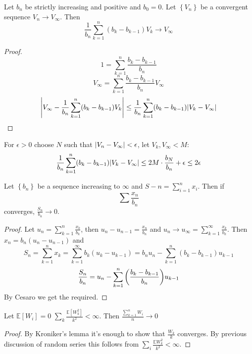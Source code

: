 \begin{lemma}
	Let $b_n$ be strictly increasing and positive and $b_0 = 0$. Let $\left\{ V_n\right\}$ be a convergent sequence $V_n\to V_\infty$. Then
	$$\frac{1}{b_n} \sum_{k=1}^n (b_k - b_{k-1})V_k \to V_\infty$$
	\begin{proof}
		$$1 = \sum_{k=1}^n \frac{b_k-b_{k-1}}{b_n} $$
		$$V_\infty = \sum_{k=1}^n \frac{b_k-b_{k-1}}{b_n} V_\infty $$
		$$\abs{V_\infty - \frac{1}{b_n} \sum_{k=1}^n (b_k-b_{k-1}) V_k} \leq \frac{1}{b_n} \sum_{k=1}^n (b_k-b_{k-1}) \abs{V_k-V_\infty}$$
	\end{proof}
For $\epsilon>0$ choose $N$ such that $\abs{V_n-V_\infty} < \epsilon$, let $V_k, V_\infty < M$:
$$\frac{1}{b_n} \sum_{k=1}^n (b_k-b_{k-1}) \abs{V_k-V_\infty} \leq 2M\cdot \frac{b_N}{b_n} + \epsilon \leq 2 \epsilon$$
\end{lemma}

\begin{lemma}
	Let $\left\{ b_n\right\}$ be a sequence increasing to $\infty$ and $S-n = \sum_{i=1}^n x_i$. Then if
	$$\sum \frac{x_n}{b_n}$$
	converges, $\frac{S_n}{b_n} \to 0$.
	
	\begin{proof}
		Let $u_n=\sum_{k=1}^n \frac{x_k}{b_k}$, then $u_n-u_{n-1} = \frac{x_n}{b_n}$ and $u_n \to u_\infty = \sum_{k=1}^\infty \frac{x_k}{b_k}$. Then
		$x_n = b_n(u_n-u_{n-1})$ and
		$$S_n = \sum_{k=1}^n x_k = \sum_{k=1}^\infty b_k(u_k-u_{k-1}) = b_nu_n - \sum_{k=1}^n (b_k-b_{k-1} ) u_{k-1}$$
		$$\frac{S_n}{b_n} = u_n - \sum_{k=1}^n \qty(\frac{b_k-b_{k-1}}{b_n})u_{k-1}$$
		By Cesaro we get the required.
	\end{proof}
\end{lemma}
\begin{lemma}
	Let $\mathbb{E}[W_i] = 0$ $\sum_k \frac{\mathbb{E}[W_k^2]}{k^2} <\infty$.
Then $\frac{\sum_{k=1}^n W_i}{n} \to 0$
\begin{proof}
	By Kroniker's lemma it's enough to show that $\frac{W_k}{k}$ converges. By previous discussion of random series this follows from $\sum_i \frac{\mathbb{E} W_k^2}{k^2} < \infty$.
\end{proof}
\end{lemma}